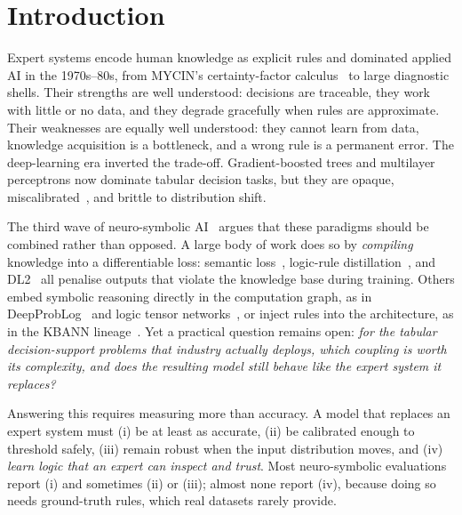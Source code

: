 \documentclass[11pt]{article}
\begin{document}
\section{Introduction}
\label{sec:intro}
Expert systems encode human knowledge as explicit rules and dominated applied AI
in the 1970s--80s, from MYCIN's certainty-factor calculus~\cite{shortliffe1975mycin}
to large diagnostic shells. Their strengths are well understood: decisions are
traceable, they work with little or no data, and they degrade gracefully when
rules are approximate. Their weaknesses are equally well understood: they cannot
learn from data, knowledge acquisition is a bottleneck, and a wrong rule is a
permanent error. The deep-learning era inverted the trade-off. Gradient-boosted
trees and multilayer perceptrons now dominate tabular decision tasks, but they are
opaque, miscalibrated~\cite{guo2017calibration}, and brittle to distribution
shift.

The third wave of neuro-symbolic AI~\cite{garcez2023neurosymbolic,kautz2022third}
argues that these paradigms should be combined rather than opposed. A large body
of work does so by \emph{compiling} knowledge into a differentiable loss: semantic
loss~\cite{xu2018semantic}, logic-rule distillation~\cite{hu2016harnessing}, and
DL2~\cite{fischer2019dl2} all penalise outputs that violate the knowledge base
during training. Others embed symbolic reasoning directly in the computation
graph, as in DeepProbLog~\cite{manhaeve2018deepproblog} and logic tensor
networks~\cite{badreddine2022logic}, or inject rules into the architecture, as in
the KBANN lineage~\cite{towell1994kbann,garcez2002neural}. Yet a practical
question remains open: \emph{for the tabular decision-support problems that
industry actually deploys, which coupling is worth its complexity, and does the
resulting model still behave like the expert system it replaces?}

Answering this requires measuring more than accuracy. A model that replaces an
expert system must (i) be at least as accurate, (ii) be calibrated enough to
threshold safely, (iii) remain robust when the input distribution moves, and
(iv) \emph{learn logic that an expert can inspect and trust}. Most neuro-symbolic
evaluations report (i) and sometimes (ii) or (iii); almost none report (iv),
because doing so needs ground-truth rules, which real datasets rarely provide.
\end{document}
